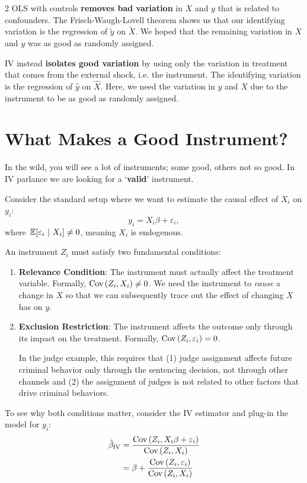 \documentclass[12pt]{article}
\begin{document}
\begin{multicols}{2}
OLS with controls \textbf{removes bad variation} in $X$ and $y$ that is related to confounders.
The Frisch-Waugh-Lovell theorem shows us that our identifying variation is the regression of $\tilde{y}$ on $\tilde{X}$. 
We hoped that the remaining variation in $X$ and $y$ was as good as randomly assigned.

IV instead \textbf{isolates good variation} by using only the variation in treatment that comes from the external shock, i.e. the instrument.
The identifying variation is the regression of $\hat{y}$ on $\hat{X}$. 
Here, we need the variation in $y$ and $X$ due to the instrument to be as good as randomly assigned.


\section*{What Makes a Good Instrument?}

In the wild, you will see a lot of instruments; some good, others not so good. 
In IV parlance we are looking for a `\textbf{valid}' instrument.

Consider the standard setup where we want to estimate the causal effect of $X_i$ on $y_i$:
$$
  y_i = X_i \beta + \varepsilon_i,
$$
where $\expec{\varepsilon_i}{X_i} \neq 0$, meaning $X_i$ is endogenous.

An instrument $Z_i$ must satisfy two fundamental conditions:

\begin{enumerate}
  \item \textbf{Relevance Condition}: The instrument must actually affect the treatment variable.
  Formally, $\cov{Z_i, X_i} \neq 0$.
  We need the instrument to \emph{cause} a change in $X$ so that we can subsequently trace out the effect of changing $X$ has on $y$.
  
  \item \textbf{Exclusion Restriction}: The instrument affects the outcome only through its impact on the treatment.
  Formally, $\cov{Z_i, \varepsilon_i} = 0$.

  In the judge example, this requires that (1) judge assignment affects future criminal behavior only through the sentencing decision, not through other channels and (2) the assignment of judges is not related to other factors that drive criminal behaviors.
\end{enumerate}

To see why both conditions matter, consider the IV estimator and plug-in the model for $y_i$:
\begin{align*}
  \hat{\beta}_{\text{IV}} 
  &= \frac{\cov{Z_i, X_i \beta + \varepsilon_i}}{\cov{Z_i, X_i}} \\
  &= \beta + \frac{\cov{Z_i, \varepsilon_i}}{\cov{Z_i, X_i}}
\end{align*}


\end{multicols}
\end{document}
